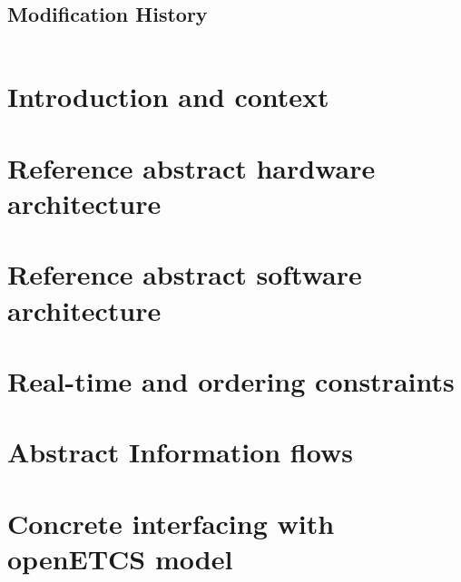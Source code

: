 \documentclass{template/openetcs_report}
\begin{document}
\section*{Modification History}
\begin{supertabular}{| m{1.2cm} | m{1.2cm} | m{6.6cm} | m{4cm} |}
 & & & \\\hline
\end{supertabular}

\tableofcontents
\listoffiguresandtables





\mainmatter


\chapter{Introduction and context}

\cite{alstom-api}

\chapter{Reference abstract hardware architecture}

\chapter{Reference abstract software architecture}

\chapter{Real-time and ordering constraints}

\chapter{Abstract Information flows}

\chapter{Concrete interfacing with openETCS model}





\end{document}
